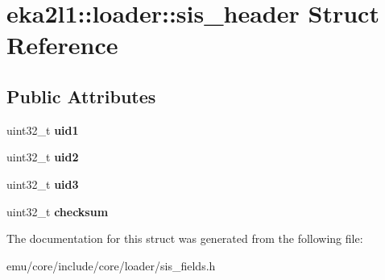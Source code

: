 \hypertarget{structeka2l1_1_1loader_1_1sis__header}{}\section{eka2l1\+:\+:loader\+:\+:sis\+\_\+header Struct Reference}
\label{structeka2l1_1_1loader_1_1sis__header}
\subsection*{Public Attributes}
\begin{DoxyCompactItemize}
\item 
\mbox{\label{structeka2l1_1_1loader_1_1sis__header_a70e30a8fdc0fa48c5c9258951a326848}} 
uint32\+\_\+t {\bfseries uid1}
\item 
\mbox{\label{structeka2l1_1_1loader_1_1sis__header_af0936b47d1f8c059f5bcc1357980d97b}} 
uint32\+\_\+t {\bfseries uid2}
\item 
\mbox{\label{structeka2l1_1_1loader_1_1sis__header_aa2bb78620f864a3cf5b18a96041a3631}} 
uint32\+\_\+t {\bfseries uid3}
\item 
\mbox{\label{structeka2l1_1_1loader_1_1sis__header_a0191a04be5049fcd7d6495d52677dc5a}} 
uint32\+\_\+t {\bfseries checksum}
\end{DoxyCompactItemize}


The documentation for this struct was generated from the following file\+:\begin{DoxyCompactItemize}
\item 
emu/core/include/core/loader/sis\+\_\+fields.\+h\end{DoxyCompactItemize}
